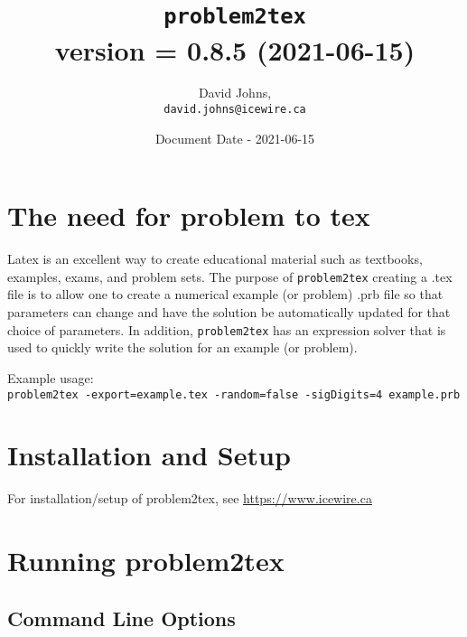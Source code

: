 \documentclass{article}
\title{\color{blue}\texttt{problem2tex} \\ \normalsize{version = 0.8.5 (2021-06-15)}}
\author{
David Johns, \\ \texttt{david.johns@icewire.ca}
}
\date{Document Date - 2021-06-15}
\begin{document}
\maketitle
\tableofcontents

\section{The need for problem to tex}


Latex is an excellent way to create educational material such as textbooks, examples, exams, and problem sets.  The purpose of \texttt{problem2tex} creating a .tex file is to allow one to create a numerical example (or problem) .prb file so that parameters can change and have the solution be automatically updated for that choice of parameters.  In addition, \texttt{problem2tex} has an expression solver that is used to quickly write the solution for an example (or problem).  

Example usage:\\
\texttt{problem2tex -export=example.tex -random=false -sigDigits=4 example.prb}

\section{Installation and Setup}

For installation/setup of problem2tex, see \href{https://www.icewire.ca}{https://www.icewire.ca}




\section{Running problem2tex}

\subsection{Command Line Options}
\end{document}
